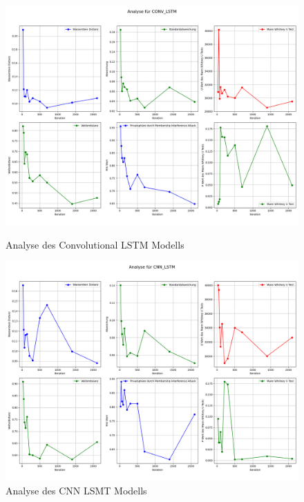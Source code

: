 \begin{figure}[ht]
    \centering
    \begin{minipage}{0.5\textwidth}
        \centering
        \includegraphics[width=\textwidth]{includes/figures/graphs/CONV_LSTM_analysis.png}
        \caption{Analyse des Convolutional LSTM Modells}
        \label{fig:graphs_conv_analysis}
    \end{minipage}\hfill
    \begin{minipage}{0.5\textwidth}
        \centering
        \includegraphics[width=\textwidth]{includes/figures/graphs/CNN_LSTM_analysis.png}
        \caption{Analyse des CNN LSMT Modells}
        \label{fig:graphs_cnn_analysis}
    \end{minipage}
\end{figure}



